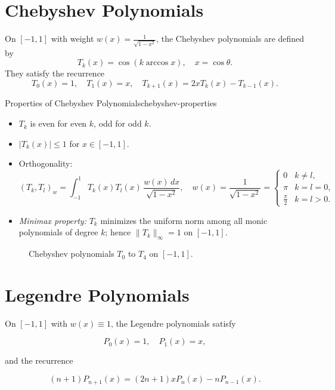 \section{Chebyshev Polynomials}
On $[-1,1]$ with weight $w(x) = \frac{1}{\sqrt{1-x^2}}$, the Chebyshev polynomials are defined by
\[
    T_k(x) = \cos(k \arccos x), \quad x = \cos \theta.
\]
They satisfy the recurrence
\[
    T_0(x) = 1, \quad T_1(x) = x, \quad T_{k+1}(x) = 2x T_k(x) - T_{k-1}(x).
\]
\begin{property}{Properties of Chebyshev Polynomials}{chebyshev-properties}
    \begin{itemize}
        \item $T_k$ is even for even $k$, odd for odd $k$.
        \item $|T_k(x)| \leq 1$ for $x \in [-1,1]$.
        \item Orthogonality:
              \[
                  (T_k, T_l)_w = \int_{-1}^1 T_k(x) T_l(x)\,\frac{w(x)\,dx}{\sqrt{1-x^2}},\quad w(x)=\frac{1}{\sqrt{1-x^2}} =
                  \begin{cases}
                      0             & k \neq l,  \\
                      \pi           & k = l = 0, \\
                      \frac{\pi}{2} & k = l > 0.
                  \end{cases}
              \]
        \item \emph{Minimax property:} $T_k$ minimizes the uniform norm among all monic polynomials of degree $k$; hence $\|T_k\|_\infty=1$ on $[-1,1]$.
    \end{itemize}
\end{property}

\begin{figure}[htbp!]
    \centering
    
    \caption{Chebyshev polynomials $T_0$ to $T_4$ on $[-1,1]$.}
    \label{fig:chebyshev-plot}
\end{figure}

\section{Legendre Polynomials}
On $[-1,1]$ with $w(x) \equiv 1$, the Legendre polynomials satisfy

\[
    P_0(x) = 1, \quad P_1(x) = x,
\]

and the recurrence

\[
    (n+1) P_{n+1}(x) = (2n+1) x P_n(x) - n P_{n-1}(x).
\]

